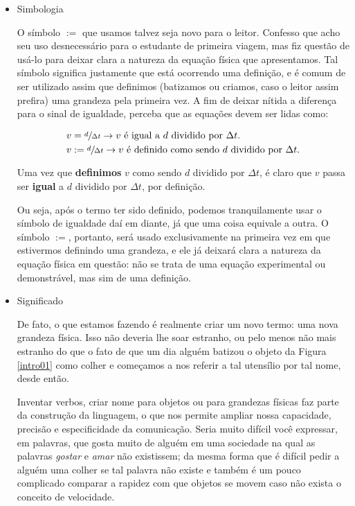 \begin{itemize}
    \item [(i)] Simbologia

    O símbolo $:=$ que usamos talvez seja novo para o leitor. Confesso que acho seu uso desnecessário para o estudante de primeira viagem, mas fiz questão de usá-lo para deixar clara a natureza da equação física que apresentamos. Tal símbolo significa justamente que está ocorrendo uma definição, e é comum de ser utilizado assim que definimos (batizamos ou criamos, caso o leitor assim prefira) uma grandeza pela primeira vez. A fim de deixar nítida a diferença para o sinal de igualdade, perceba que as equações devem ser lidas como:

    \begin{align}
        v &= \sfrac{d}{\Delta t} \rightarrow v \text{ é igual a } d \text{ dividido por } \Delta t .\nonumber \\ 
        v &:= \sfrac{d}{\Delta t} \rightarrow v \text{ é definido como sendo } d \text{ dividido por } \Delta t  .\nonumber
    \end{align}

Uma vez que \textbf{definimos} $v$ como sendo $d$ dividido por $\Delta t$, é claro que $v$ passa ser \textbf{igual} a $d$ dividido por $\Delta t$, por definição. 

Ou seja, após o termo ter sido definido, podemos tranquilamente usar o símbolo de igualdade daí em diante, já que uma coisa equivale a outra. O símbolo $:=$, portanto, será usado exclusivamente na primeira vez em que estivermos definindo uma grandeza, e ele já deixará clara a natureza da equação física em questão: não se trata de uma equação experimental ou demonstrável, mas sim de uma definição.

    \item [(ii)] Significado

    De fato, o que estamos fazendo é realmente criar um novo termo: uma nova grandeza física. Isso não deveria lhe soar estranho, ou pelo menos não mais estranho do que o fato de que um dia alguém batizou o objeto da Figura \ref{intro01} como colher e começamos a nos referir a tal utensílio por tal nome, desde então. 
    
    Inventar verbos, criar nome para objetos ou para grandezas físicas faz parte da construção da linguagem, o que nos permite ampliar nossa capacidade, precisão e especificidade da comunicação. Seria muito difícil você expressar, em palavras, que gosta muito de alguém em uma sociedade na qual as palavras \textit{gostar} e \textit{amar} não existissem; da mesma forma que é difícil pedir a alguém uma colher se tal palavra não existe e também é um pouco complicado comparar a rapidez com que objetos se movem caso não exista o conceito de velocidade.
    

\end{itemize}

